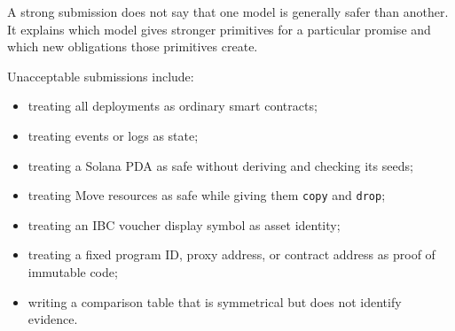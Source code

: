 A strong submission does not say that one model is generally safer than another. It explains which model gives stronger primitives for a particular promise and which new obligations those primitives create.

Unacceptable submissions include:

\begin{itemize}
\item treating all deployments as ordinary smart contracts;
\item treating events or logs as state;
\item treating a Solana PDA as safe without deriving and checking its seeds;
\item treating Move resources as safe while giving them \texttt{copy} and \texttt{drop};
\item treating an IBC voucher display symbol as asset identity;
\item treating a fixed program ID, proxy address, or contract address as proof of immutable code;
\item writing a comparison table that is symmetrical but does not identify evidence.
\end{itemize}

